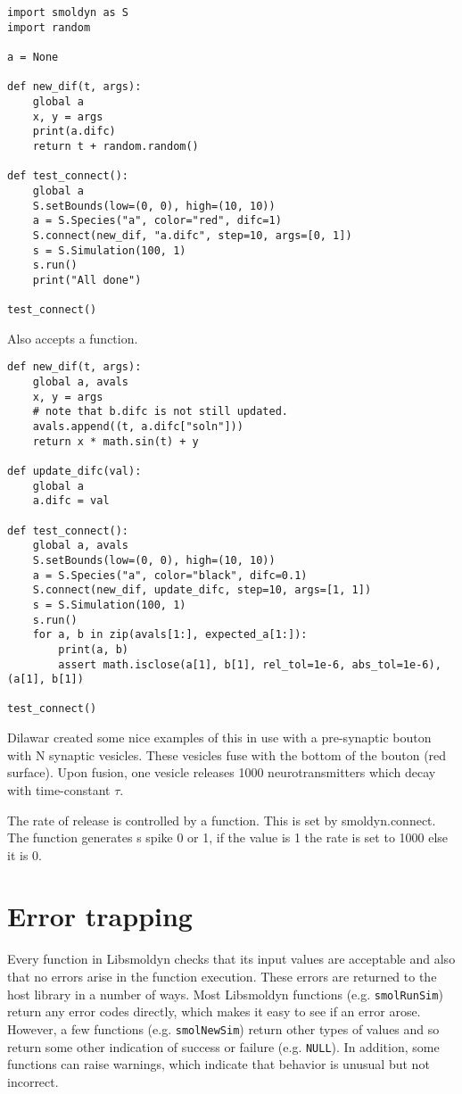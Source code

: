 \documentclass {book}
\begin{document}
\begin{verbatim}
import smoldyn as S
import random

a = None

def new_dif(t, args):
    global a
    x, y = args
    print(a.difc)
    return t + random.random()

def test_connect():
    global a
    S.setBounds(low=(0, 0), high=(10, 10))
    a = S.Species("a", color="red", difc=1)
    S.connect(new_dif, "a.difc", step=10, args=[0, 1])
    s = S.Simulation(100, 1)
    s.run()
    print("All done")

test_connect()
\end{verbatim}

Also accepts a function.

\begin{verbatim}
def new_dif(t, args):
    global a, avals
    x, y = args
    # note that b.difc is not still updated.
    avals.append((t, a.difc["soln"]))
    return x * math.sin(t) + y

def update_difc(val):
    global a
    a.difc = val

def test_connect():
    global a, avals
    S.setBounds(low=(0, 0), high=(10, 10))
    a = S.Species("a", color="black", difc=0.1)
    S.connect(new_dif, update_difc, step=10, args=[1, 1])
    s = S.Simulation(100, 1)
    s.run()
    for a, b in zip(avals[1:], expected_a[1:]):
        print(a, b)
        assert math.isclose(a[1], b[1], rel_tol=1e-6, abs_tol=1e-6), (a[1], b[1])

test_connect()
\end{verbatim}

Dilawar created some nice examples of this in use with a pre-synaptic bouton with N synaptic vesicles. These vesicles fuse with the bottom of the bouton (red surface). Upon fusion, one vesicle releases 1000 neurotransmitters which decay with time-constant $\tau$.

The rate of release is controlled by a function. This is set by smoldyn.connect. The function generates s spike 0 or 1, if the value is 1 the rate is set to 1000 else it is 0.

\chapter{Error trapping}

Every function in Libsmoldyn checks that its input values are acceptable and also that no errors arise in the function execution. These errors are returned to the host library in a number of ways. Most Libsmoldyn functions (e.g. \texttt{smolRunSim}) return any error codes directly, which makes it easy to see if an error arose. However, a few functions (e.g. \texttt{smolNewSim}) return other types of values and so return some other indication of success or failure (e.g. \texttt{NULL}). In addition, some functions can raise warnings, which indicate that behavior is unusual but not incorrect.
\end{document}
